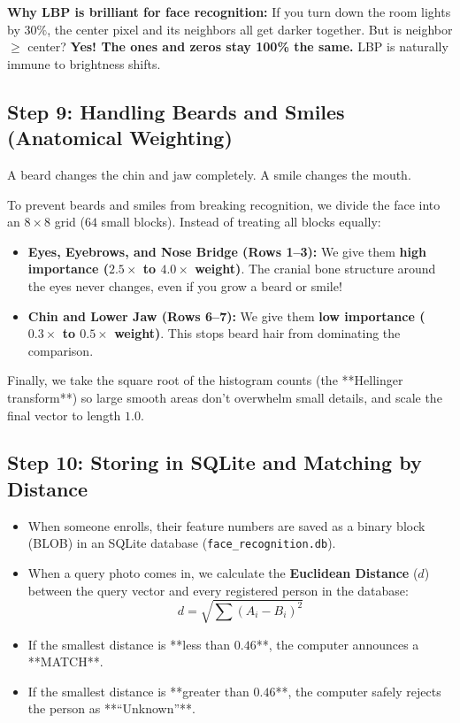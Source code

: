 \documentclass[11pt,a4paper]{article}
\begin{document}
\textbf{Why LBP is brilliant for face recognition:}
If you turn down the room lights by $30\%$, the center pixel and its neighbors all get darker together. But is neighbor $\ge$ center? \textbf{Yes! The ones and zeros stay 100\% the same.} LBP is naturally immune to brightness shifts.

\subsection{Step 9: Handling Beards and Smiles (Anatomical Weighting)}
A beard changes the chin and jaw completely. A smile changes the mouth. 

To prevent beards and smiles from breaking recognition, we divide the face into an $8 \times 8$ grid ($64$ small blocks). Instead of treating all blocks equally:
\begin{itemize}[leftmargin=1.5em]
    \item \textbf{Eyes, Eyebrows, and Nose Bridge (Rows 1--3):} We give them \textbf{high importance ($2.5\times$ to $4.0\times$ weight)}. The cranial bone structure around the eyes never changes, even if you grow a beard or smile!
    \item \textbf{Chin and Lower Jaw (Rows 6--7):} We give them \textbf{low importance ($0.3\times$ to $0.5\times$ weight)}. This stops beard hair from dominating the comparison.
\end{itemize}

Finally, we take the square root of the histogram counts (the **Hellinger transform**) so large smooth areas don't overwhelm small details, and scale the final vector to length $1.0$.

\subsection{Step 10: Storing in SQLite and Matching by Distance}
\begin{itemize}[leftmargin=1.5em]
    \item When someone enrolls, their feature numbers are saved as a binary block (BLOB) in an SQLite database (\texttt{face\_recognition.db}).
    \item When a query photo comes in, we calculate the \textbf{Euclidean Distance} ($d$) between the query vector and every registered person in the database:
    \begin{equation}
        d = \sqrt{\sum (A_i - B_i)^2}
    \end{equation}
    \item If the smallest distance is **less than $0.46$**, the computer announces a **MATCH**.
    \item If the smallest distance is **greater than $0.46$**, the computer safely rejects the person as **``Unknown''**.
\end{itemize}
\end{document}
